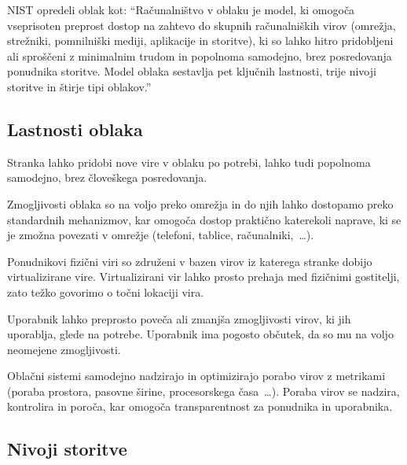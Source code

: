 \documentclass[12pt,a4paper,openany,tikz]{book}
\theoremstyle{plain}
\theoremstyle{definition}
\begin{document}
\gls{NIST} opredeli oblak kot: ``Računalništvo v oblaku je model, ki omogoča vseprisoten preprost dostop na zahtevo do skupnih računalniških virov (omrežja, strežniki, pomnilniški mediji, aplikacije in storitve), ki so lahko hitro pridobljeni ali sproščeni z minimalnim trudom in popolnoma samodejno, brez posredovanja ponudnika storitve. Model oblaka sestavlja pet ključnih lastnosti, trije nivoji storitve in štirje tipi oblakov.''~\cite{mell2011nist}

\subsection*{Lastnosti oblaka}
\label{sub:Lastnosti oblaka}

\begin{description}[style=nextline]
   \item[Storitev na zahtevo] Stranka lahko pridobi nove vire v oblaku po potrebi, lahko tudi popolnoma samodejno, brez človeškega posredovanja.

   \item[Širok dostop preko omrežja] Zmogljivosti oblaka so na voljo preko omrežja in do njih lahko dostopamo preko standardnih mehanizmov, kar omogoča dostop praktično katerekoli naprave, ki se je zmožna povezati v omrežje (telefoni, tablice, računalniki,~\ldots).

   \item[Uporaba skupnih virov] Ponudnikovi fizični viri so združeni v bazen virov iz katerega stranke dobijo virtualizirane vire. Virtualizirani vir lahko prosto prehaja med fizičnimi gostitelji, zato težko govorimo o točni lokaciji vira.

   \item[Bliskovita prožnost] Uporabnik lahko preprosto poveča ali zmanjša zmogljivosti virov, ki jih uporablja, glede na potrebe. Uporabnik ima pogosto občutek, da so mu na voljo neomejene zmogljivosti.

   \item[Merjenje porabe in obračun glede na porabo virov]  Oblačni sistemi samodejno nadzirajo in optimizirajo porabo virov z metrikami (poraba prostora, pasovne širine, procesorskega časa~\ldots). Poraba virov se nadzira, kontrolira in poroča, kar omogoča transparentnost za ponudnika in uporabnika.
\end{description}

\subsection*{Nivoji storitve}
\label{sub:Nivoji storitve}
\end{document}
